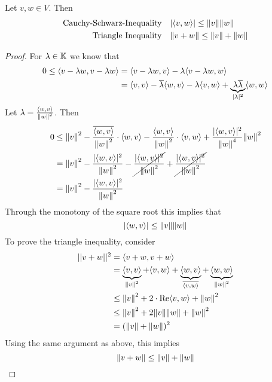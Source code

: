 \documentclass[../../script.tex]{subfiles}
\begin{document}
\begin{thm}
    Let $v, w \in V$. Then 
    \begin{align*}
        \text{Cauchy-Schwarz-Inequality} && &|\langle v,w\rangle| \le \norm{v}\norm{w} \\
        \text{Triangle Inequality} && &\norm{v + w} \le \norm{v} + \norm{w}
    \end{align*}
\end{thm}
\begin{proof}
    For $\lambda \in \mathbb{K}$ we know that
    \begin{equation}
    \begin{split}
        0 \le \langle v - \lambda w,v - \lambda w\rangle &= \langle v - \lambda w,v\rangle - \lambda\langle v - \lambda w,w\rangle \\
        &= \langle v,v\rangle - \overline{\lambda}\langle w,v\rangle - \lambda\langle v,w\rangle + \underbrace{\lambda\overline{\lambda}}_{|\lambda|^2}\langle w,w\rangle
    \end{split}
    \end{equation}
    Let $\lambda = \frac{\langle w,v\rangle}{\norm{w}^2}$. Then 
    \begin{equation}
    \begin{split}
        0 &\le \norm{v}^2 - \frac{\overline{\langle w,v\rangle}}{\norm{w}^2} \cdot \langle w,v\rangle - \frac{\langle w,v\rangle}{\norm{w}^2} \cdot \langle v,w\rangle + \frac{|\langle w,v\rangle|^2}{\norm{w}^4} \norm{w}^2 \\
        &= \norm{v}^2 - \frac{|\langle w,v\rangle|^2}{\norm{w}^2} - \cancel{\frac{|\langle w,v\rangle|^2}{\norm{w}^2}} + \cancel{\frac{|\langle w,v\rangle|^2}{\norm{w}^2}} \\
        &= \norm{v}^2 - \frac{|\langle w,v\rangle|^2}{\norm{w}^2}
    \end{split}
    \end{equation}
    Through the monotony of the square root this implies that
    \begin{equation}
        |\langle w,v\rangle| \le \norm{v} \norm{w}
    \end{equation}
    To prove the triangle inequality, consider
    \begin{equation}
    \begin{split}
        ||v + w||^2 &= \langle v+w,v+w\rangle \\
        &= \underbrace{\langle v,v\rangle}_{\norm{v}^2} + \langle v,w\rangle + \underbrace{\langle w,v\rangle}_{\overline{\langle v,w\rangle}} + \underbrace{\langle w,w\rangle}_{\norm{w}^2} \\
        &\le \norm{v}^2 + 2 \cdot \Re\langle v,w\rangle + \norm{w}^2 \\
        &\le \norm{v}^2 + 2\norm{v}\norm{w} + \norm{w}^2 \\
        &= (\norm{v} + \norm{w})^2
    \end{split}
    \end{equation}
    Using the same argument as above, this implies
    \begin{equation}
        \norm{v + w} \le \norm{v} + \norm{w}
    \end{equation}
\end{proof}
\end{document}
